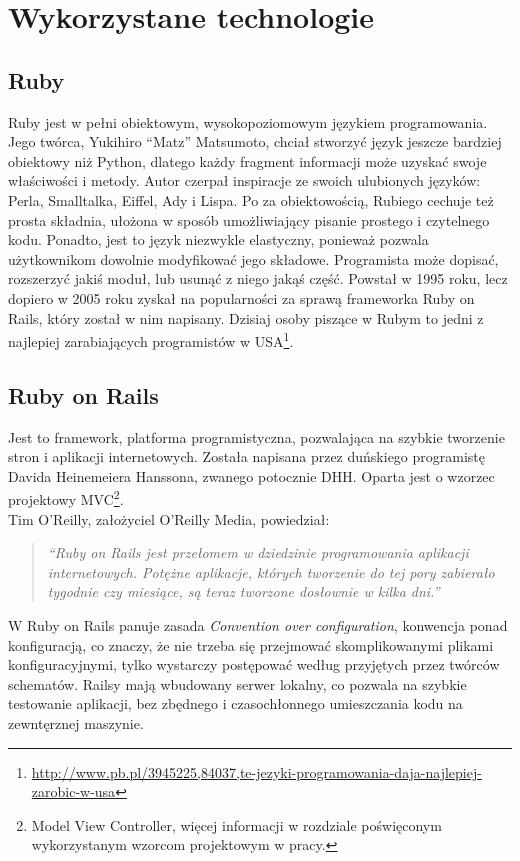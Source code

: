 \section{Wykorzystane technologie}
  \subsection{Ruby}
  Ruby jest w pełni obiektowym, wysokopoziomowym językiem programowania. Jego twórca, Yukihiro “Matz” Matsumoto, chciał stworzyć język jeszcze bardziej obiektowy niż Python, dlatego każdy fragment informacji może uzyskać swoje właściwości i metody. Autor czerpał inspiracje ze swoich ulubionych języków: Perla, Smalltalka, Eiffel, Ady i Lispa. Po za obiektowością, Rubiego cechuje też prosta składnia, ułożona w sposób umożliwiający pisanie prostego i czytelnego kodu. Ponadto, jest to język niezwykle elastyczny, ponieważ pozwala użytkownikom dowolnie modyfikować jego składowe. Programista może dopisać, rozszerzyć jakiś moduł, lub usunąć z niego jakąś część. Powstał w 1995 roku, lecz dopiero w 2005 roku zyskał na popularności za sprawą frameworka Ruby on Rails, który został w nim napisany. Dzisiaj osoby piszące w Rubym to jedni z najlepiej zarabiających programistów w USA\footnote{\url{http://www.pb.pl/3945225,84037,te-jezyki-programowania-daja-najlepiej-zarobic-w-usa}}.

  \subsection{Ruby on Rails}
  Jest to framework, platforma programistyczna, pozwalająca na szybkie tworzenie stron i aplikacji internetowych. Została napisana przez duńskiego programistę Davida Heinemeiera Hanssona, zwanego potocznie DHH. Oparta jest o wzorzec projektowy MVC\footnote{Model View Controller, więcej informacji w rozdziale poświęconym wykorzystanym wzorcom projektowym w pracy.}. \\
  Tim O'Reilly, założyciel O'Reilly Media, powiedział:
  \begin{quote}
    \emph{“Ruby on Rails jest przełomem w dziedzinie programowania aplikacji internetowych.
    Potężne aplikacje, których tworzenie do tej pory zabierało tygodnie czy miesiące, są teraz tworzone dosłownie w kilka dni.”}
  \end{quote}
  W Ruby on Rails panuje zasada \emph{Convention over configuration}, konwencja ponad konfiguracją, co znaczy, że nie trzeba się przejmować skomplikowanymi plikami konfiguracyjnymi, tylko wystarczy postępować według przyjętych przez twórców schematów. Railsy mają wbudowany serwer lokalny, co pozwala na szybkie testowanie aplikacji, bez zbędnego i czasochłonnego umieszczania kodu na zewntęrznej maszynie.

